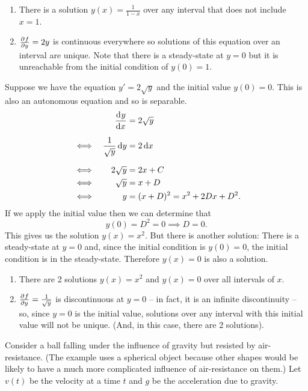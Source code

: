 \documentclass[../MathsNotesBase.tex]{subfiles}
\begin{document}
{\begin{exe}
{				\begin{enumerate}[label=(\roman*)]
					\item{There is a solution ${ y(x) = \frac{1}{1-x} }$ over any interval that does not include ${ x = 1 }$.}
					\item{${ \tpd{f}{y} = 2y }$ is continuous everywhere so solutions of this equation over an interval are unique. Note that there is a steady-state at ${ y = 0 }$ but it is unreachable from the initial condition of ${ y(0) = 1 }$.}
				\end{enumerate}
			}
			\biggerskip
			\item{Suppose we have the equation ${ y' = 2\sqrt{y} }$ and the initial value ${ y(0) = 0 }$. This is also an autonomous equation and so is separable.
				\begin{align*}
					&& \dod{y}{x} &= 2\sqrt{y} \nn
					&\iff & \frac{1}{\sqrt{y}} \dif y &= 2 \dif x \nn
					&\iff & 2\sqrt{y} &= 2x + C \\
					&\iff & \sqrt{y} &= x + D \\
					&\iff & y &= (x + D)^2 = x^2 + 2Dx + D^2.
				\end{align*}
				If we apply the initial value then we can determine that
				\[ y(0) = D^2 = 0 \implies D = 0. \]
				This gives us the solution ${ y(x) = x^2 }$. But there is another solution: There is a steady-state at ${ y = 0 }$ and, since the initial condition is ${ y(0) = 0 }$, the initial condition is in the steady-state. Therefore ${ y(x) = 0 }$ is also a solution.\\
				
				\begin{enumerate}[label=(\roman*)]
					\item{There are 2 solutions ${ y(x) = x^2 }$ and ${ y(x) = 0 }$ over all intervals of $x$.}
					\item{${ \tpd{f}{y} = \frac{1}{\sqrt{y}} }$ is discontinuous at ${ y = 0 }$ -- in fact, it is an infinite discontinuity -- so, since ${ y = 0 }$ is the initial value, solutions over any interval with this initial value will not be unique. (And, in this case, there are 2 solutions).}
				\end{enumerate}
			}
			\biggerskip
			\item{Consider a ball falling under the influence of gravity but resisted by air-resistance. (The example uses a spherical object because other shapes would be likely to have a much more complicated influence of air-resistance on them.) Let $v(t)$ be the velocity at a time $t$ and $g$ be the acceleration due to gravity.\\
				
}
\end{exe}}
\end{document}
